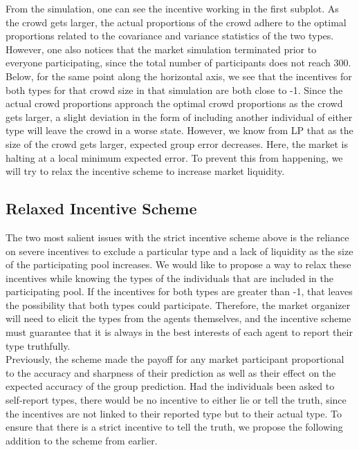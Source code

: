 \documentclass[twoside,twocolumn]{article}
\begin{document}
From the simulation, one can see the incentive working in the first subplot. As the crowd gets larger, the actual proportions of the crowd adhere to the optimal proportions related to the covariance and variance statistics of the two types. However, one also notices that the market simulation terminated prior to everyone participating, since the total number of participants does not reach 300. Below, for the same point along the horizontal axis, we see that the incentives for both types for that crowd size in that simulation are both close to -1. Since the actual crowd proportions approach the optimal crowd proportions as the crowd gets larger, a slight deviation in the form of including another individual of either type will leave the crowd in a worse state. However, we know from LP \cite{3} that as the size of the crowd gets larger, expected group error decreases. Here, the market is halting at a local minimum expected error. To prevent this from happening, we will try to relax the incentive scheme to increase market liquidity.

\subsection{Relaxed Incentive Scheme}

The two most salient issues with the strict incentive scheme above is the reliance on severe incentives to exclude a particular type and a lack of liquidity as the size of the participating pool increases. We would like to propose a way to relax these incentives while knowing the types of the individuals that are included in the participating pool. If the incentives for both types are greater than -1, that leaves the possibility that both types could participate. Therefore, the market organizer will need to elicit the types from the agents themselves, and the incentive scheme must guarantee that it is always in the best interests of each agent to report their type truthfully.\\

Previously, the scheme made the payoff for any market participant proportional to the accuracy and sharpness of their prediction as well as their effect on the expected accuracy of the group prediction. Had the individuals been asked to self-report types, there would be no incentive to either lie or tell the truth, since the incentives are not linked to their reported type but to their actual type. To ensure that there is a strict incentive to tell the truth, we propose the following addition to the scheme from earlier.
\newline
\end{document}
